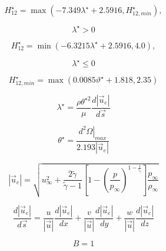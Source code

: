 \begin{equation}
H_{12}^{\star} = \max\left(-7.349 \lambda^{\star} + 2.5916,
H_{12,min}^{\star}\right),
\end{equation}

\begin{equation}
\lambda^{\star} > 0
\end{equation}

\begin{equation}
H_{12}^{\star} = \min\left(-6.3215 \lambda^{\star} + 2.5916, 4.0\right),
\end{equation}

\begin{equation}
\lambda^{\star} \leq 0
\end{equation}

\begin{equation}
H_{12,min}^{\star} = \max\left(0.0085 \vartheta^{\star} + 1.818, 2.35\right)
\end{equation}

\begin{equation}
\lambda^{\star} = \frac{\rho \theta^{\star 2}}{\mu}
\frac{d\left|\vec{u}_{e}\right|}{d\vec{s}}
\end{equation}

\begin{equation}
\theta^{\star} = \frac{\left.d^2 \Omega\right|_{max}}{2.193
\left|\vec{u}_{e}\right|}
\end{equation}

\begin{equation}
\left|\vec{u}_{e}\right| = \sqrt{u_\infty^2 + \frac{2
\tilde\gamma}{\tilde\gamma - 1} \left[1 -
\left(\frac{p}{p_{\infty}}\right)^{1-\frac{1}{\tilde\gamma}}\right]
\frac{p_\infty}{\rho_{\infty}}}
\end{equation}

\begin{equation}
\frac{d\left|\vec{u}_{e}\right|}{d\vec{s}} = 
\frac{u}{\left|\vec{u}\right|}
\frac{d\left|\vec{u}_{e}\right|}{dx} + 
\frac{v}{\left|\vec{u}\right|}
\frac{d\left|\vec{u}_{e}\right|}{dy} + 
\frac{w}{\left|\vec{u}\right|}
\frac{d\left|\vec{u}_{e}\right|}{dz}
\end{equation}

\begin{equation}
B=1
\end{equation}


